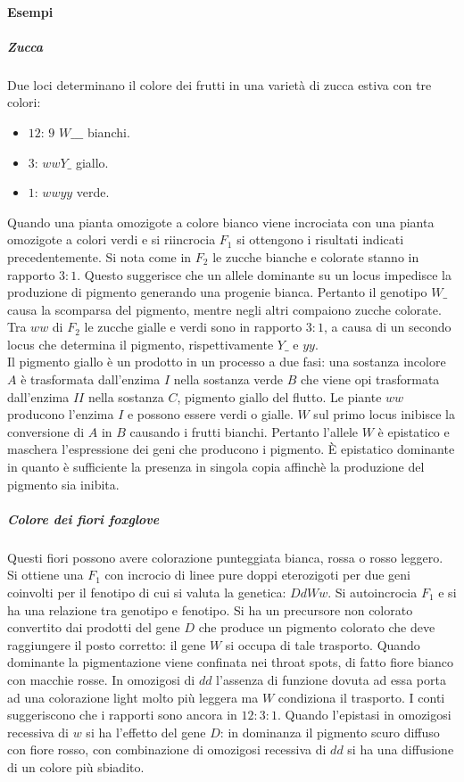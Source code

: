 \paragraph{Esempi}
\subparagraph{Zucca}
Due loci determinano il colore dei frutti in una variet\`a di zucca estiva con tre colori:
\begin{itemize}
	\item $12$: $9$ $W\_\_\_$ bianchi.
	\item $3$: $wwY\_$ giallo.
	\item $1$: $wwyy$ verde.
\end{itemize}
Quando una pianta omozigote a colore bianco viene incrociata con una pianta omozigote a colori verdi e si riincrocia $F_1$ si ottengono i risultati indicati precedentemente. Si nota come in $F_2$ le
zucche bianche e colorate stanno in rapporto $3:1$. Questo suggerisce che un allele dominante su un locus impedisce la produzione di pigmento generando una progenie bianca. Pertanto il genotipo $W\_$
causa la scomparsa del pigmento, mentre negli altri compaiono zucche colorate. Tra $ww$ di $F_2$ le zucche gialle e verdi sono in rapporto $3:1$, a causa di un secondo locus che determina il pigmento, 
rispettivamente $Y\_$ e $yy$. \\
Il pigmento giallo \`e un prodotto in un processo a due fasi: una sostanza incolore $A$ \`e trasformata dall'enzima $I$ nella sostanza verde $B$ che viene opi trasformata dall'enzima $II$ nella sostanza
$C$, pigmento giallo del flutto. Le piante $ww$ producono l'enzima $I$ e possono essere verdi o gialle. $W$ sul primo locus inibisce la conversione di $A$ in $B$ causando i frutti bianchi. 
Pertanto l'allele $W$ \`e epistatico e maschera l'espressione dei geni che producono i pigmento. \`E epistatico dominante in quanto \`e sufficiente la presenza in singola copia affinch\`e la produzione
del pigmento sia inibita. \\
\subparagraph{Colore dei fiori foxglove}
Questi fiori possono avere colorazione punteggiata bianca, rossa o rosso leggero. Si ottiene una $F_1$ con incrocio di linee pure doppi eterozigoti per due geni coinvolti per il 
fenotipo di cui si valuta la genetica: $DdWw$. Si autoincrocia $F_1$ e si ha una relazione tra genotipo e fenotipo. Si ha un precursore non colorato convertito dai prodotti del gene 
$D$ che produce un pigmento colorato che deve raggiungere il posto corretto: il gene $W$ si occupa di tale trasporto. Quando dominante la pigmentazione viene confinata nei throat 
spots, di fatto fiore bianco con macchie rosse. In omozigosi di $dd$ l'assenza di funzione dovuta ad essa porta ad una colorazione light molto pi\`u leggera ma $W$ condiziona il 
trasporto. I conti suggeriscono che i rapporti sono ancora in $12:3:1$. Quando l'epistasi in omozigosi recessiva di $w$ si ha l'effetto del gene $D$: in dominanza il pigmento scuro
diffuso con fiore rosso, con combinazione di omozigosi recessiva di $dd$ si ha una diffusione di un colore pi\`u sbiadito. 
